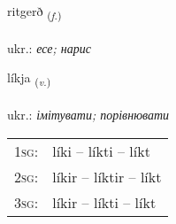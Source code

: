 \documentclass[frontgrid, backgrid]{flacards}\usepackage[]{graphicx}\usepackage[]{xcolor}
\begin{document}
\renewcommand{\flhead}{\vskip5pt \fboxsep=0pt {\small\bfseries\footnotesize Nafnorð | іменник}}
\renewcommand{\fcfoot}{\vskip5pt \fboxsep=0pt \hspace{2pt}{\small\bfseries\footnotesize 2K}}

\renewcommand{\blhead}{\vskip5pt {\small\bfseries\footnotesize Nafnorð | іменник }}
\renewcommand{\bcfoot}{\vskip5pt \hspace{2pt}{\small\bfseries\footnotesize 2K}}


{ritgerð \small{\textsubscript{(\textit{f.})}} \\[1ex] %
\textphonetic{[rɪːtcɛrð]} \\
ukr.: \emph{есе; нарис} \\  [2ex]
\renewcommand*{\arraystretch}{0.8}
}

\renewcommand{\flhead}{\vskip5pt \fboxsep=0pt {\small\bfseries\footnotesize Sagnorð | дієслово}}
\renewcommand{\fcfoot}{\vskip5pt \fboxsep=0pt \hspace{2pt}{\small\bfseries\footnotesize 2K}}

\renewcommand{\blhead}{\vskip5pt {\small\bfseries\footnotesize Sagnorð | дієслово }}
\renewcommand{\bcfoot}{\vskip5pt \hspace{2pt}{\small\bfseries\footnotesize 2K}}


{líkja \small{\textsubscript{(\textit{v.})}} \\[1ex] %
\textphonetic{[liːca]} \\
ukr.: \emph{імітувати; порівнювати} \\  [2ex]
\renewcommand*{\arraystretch}{0.8}
\begin{tabular}{p{1cm}l}
\textsc{1sg}: & líki -- líkti -- líkt \\ 
\textsc{2sg}: & líkir -- líktir -- líkt \\ 
\textsc{3sg}: & líkir -- líkti -- líkt \\ 
\end{tabular}
}
\end{document}
